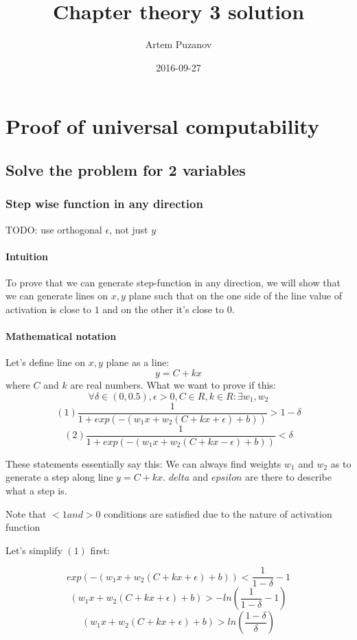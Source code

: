 \documentclass{article}
\title{Chapter theory 3 solution}
\date{2016-09-27}
\author{Artem Puzanov}
\begin{document}
\maketitle
{}
\newpage
{}


\section{Proof of universal computability}
\subsection{Solve the problem for 2 variables}

\subsubsection{Step wise function in any direction}

TODO: use orthogonal $\epsilon$, not just $y$

\paragraph{Intuition}
To prove that we can generate step-function in any direction, we will show that we can
generate lines on ${x, y}$ plane such that on the one side of the line value of activation is close to $1$
and on the other it's close to $0$. 
\paragraph{Mathematical notation}
Let's define line on ${x, y}$ plane as a line:
$$y = C + kx$$
where $C$ and $k$ are real numbers.
What we want to prove if this:
$$\forall \delta \in (0, 0.5), \epsilon > 0 , C \in R,  k \in R: \exists w_1, w_2$$
$$(1) \frac{1}{1 + exp(-(w_1x + w_2(C + kx + \epsilon) + b))} > 1 - \delta$$
$$(2) \frac{1}{1 + exp(-(w_1x + w_2(C + kx - \epsilon) + b))} < \delta$$

These statements essentially say this:
We can always find weights $w_1$ and $w_2$ as to generate a step along line $y = C + kx$.
$delta$ and $epsilon$ are there to describe what a step is.

Note that $<1 and >0$ conditions are satisfied due to the nature of activation function

Let's simplify $(1)$ first:

$$exp(-(w_1x + w_2(C + kx + \epsilon) + b)) < \frac{1}{1 - \delta} - 1$$
$$(w_1x + w_2(C + kx + \epsilon) + b) > -ln(\frac{1}{1 - \delta} - 1)$$
$$(w_1x + w_2(C + kx + \epsilon) + b) > ln(\frac{1 - \delta}{\delta})$$
\end{document}
